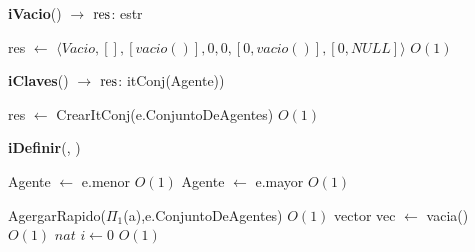 \begin{Algoritmos}

	\begin{algorithm}[H]{\textbf{iVacio}() $\to$ $\res$: estr}
        \begin{algorithmic}
            \State res $\gets$ $\langle Vacio,[],[vacio()],0,0,[0,vacio()],[0,NULL] \rangle$ \Comment $O(1)$
        \end{algorithmic}
    \end{algorithm}
    \begin{algorithm}[H]{\textbf{iClaves}() $\to$ $\res$: itConj(Agente))}
        \begin{algorithmic}
            \State res $\gets$ CrearItConj(e.ConjuntoDeAgentes) \Comment $O(1)$
        \end{algorithmic}
    \end{algorithm}
    \begin{algorithm}[H]{\textbf{iDefinir}(, )}
        \begin{algorithmic}
            	\State Agente $\gets$ e.menor \Comment $O(1)$
            \EndIf
            	\State Agente $\gets$ e.mayor \Comment $O(1)$
            \EndIf
            
            \State AgergarRapido($\Pi_{1}$(a),e.ConjuntoDeAgentes) \Comment $O(1)$
            \State vector vec $\gets$ vacia() \Comment $O(1)$ 
            \State $nat$ $i \gets 0$	\Comment $O(1)$
            

\end{algorithmic}
\end{algorithm}
\end{Algoritmos}
